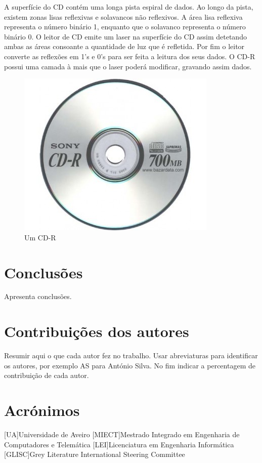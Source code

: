 \documentclass{report}
\begin{document}
	A superfície do CD contém uma longa pista espiral de dados. Ao longo da pista, existem zonas lisas reflexivas e solavancos não reflexivos. A área lisa reflexiva representa o número binário 1, enquanto que o solavanco representa o número binário 0. O leitor de CD emite um laser na superfície do CD assim detetando ambas as áreas consoante a quantidade de luz que é refletida. Por fim o leitor converte as reflexões em 1's e 0's para ser feita a leitura dos seus dados. O CD-R possui uma camada à mais que o laser poderá modificar, gravando assim dados.
\vspace{1mm}

	\begin{figure} [h]
		\centering
		\includegraphics[scale=0.4]{cd-r.jpg}
		\caption{Um CD-R}
	\end{figure}


\chapter{Conclusões}
\label{chap.conclusao}
Apresenta conclusões.

\chapter*{Contribuições dos autores}
Resumir aqui o que cada autor fez no trabalho.
Usar abreviaturas para identificar os autores,
por exemplo AS para António Silva.
No fim indicar a percentagem de contribuição de cada autor.

\chapter*{Acrónimos}
\begin{acronym}
[UA]{Universidade de Aveiro}
[MIECT]{Mestrado Integrado em Engenharia de Computadores e Telemática}
[LEI]{Licenciatura em Engenharia Informática}
[GLISC]{Grey Literature International Steering Committee}
\end{acronym}


\printbibliography
\end{document}
